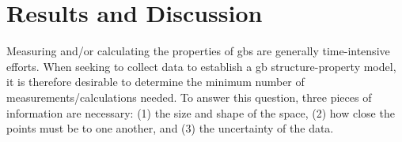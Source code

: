 \documentclass[final,twocolumn,12pt]{elsarticle}
\begin{document}
	
	
	\section{Results and Discussion} \label{sec:results}

    Measuring and/or calculating the properties of \glspl{gb} are generally time-intensive efforts. When seeking to collect data to establish a \gls{gb} structure-property model, it is therefore desirable to determine the minimum number of measurements/calculations needed. To answer this question, three pieces of information are necessary: (1) the size and shape of the space, (2) how close the points must be to one another, and (3) the uncertainty of the data.
    
\end{document}
